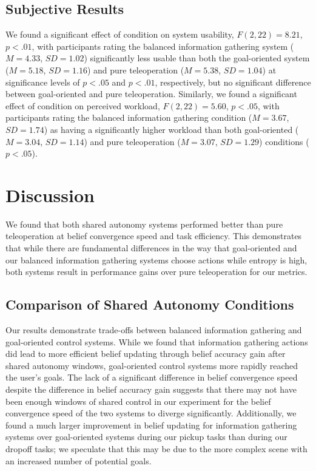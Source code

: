 \documentclass[conference]{IEEEtran}
\begin{document}
\subsection{Subjective Results}

We found a significant effect of condition on system usability, $F(2, 22) = 8.21$, $p < .01$, with participants rating the balanced information gathering system ($M = 4.33$, $SD = 1.02$) significantly less usable than both the goal-oriented system ($M = 5.18$, $SD = 1.16$) and pure teleoperation ($M = 5.38$, $SD = 1.04$) at significance levels of $p < .05$ and $p < .01$, respectively, but no significant difference between goal-oriented and pure teleoperation. Similarly, we found a significant effect of condition on perceived workload, $F(2, 22) = 5.60$, $p < .05$, with participants rating the balanced information gathering condition ($M = 3.67$, $SD = 1.74$) as having a significantly higher workload than both goal-oriented ($M = 3.04$, $SD = 1.14$) and pure teleoperation ($M = 3.07$, $SD = 1.29$) conditions ($p < .05$).

\section{Discussion}
We found that both shared autonomy systems performed better than pure teleoperation at belief convergence speed and task efficiency. This demonstrates that while there are fundamental differences in the way that goal-oriented and our balanced information gathering systems choose actions while entropy is high, both systems result in performance gains over pure teleoperation for our metrics.

\subsection{Comparison of Shared Autonomy Conditions}

Our results demonstrate trade-offs between balanced information gathering and goal-oriented control systems. While we found that information gathering actions did lead to more efficient belief updating through belief accuracy gain after shared autonomy windows, goal-oriented control systems more rapidly reached the user's goals. The lack of a significant difference in belief convergence speed despite the difference in belief accuracy gain suggests that there may not have been enough windows of shared control in our experiment for the belief convergence speed of the two systems to diverge significantly. Additionally, we found a much larger improvement in belief updating for information gathering systems over goal-oriented systems during our pickup tasks than during our dropoff tasks; we speculate that this may be due to the more complex scene with an increased number of potential goals.
\end{document}

